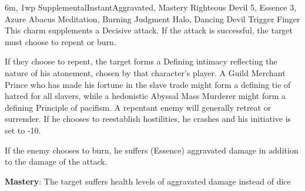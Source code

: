 {6m, 1wp}
{Supplemental}{Instant}{Aggravated, Mastery}
{Righteous Devil 5, Essence 3, Azure Abacus Meditation, Burning Judgment Halo, Dancing Devil Trigger Finger}
This charm supplements a Decisive attack.
If the attack is successful, the target must choose to repent or burn.

If they choose to repent, the target forms a Defining intimacy reflecting the nature of his atonement,
chosen by that character's player.
A Guild Merchant Prince who has made his fortune in the slave trade might form a defining tie of hatred for all slavers,
while a hedonistic Abyssal Mass Murderer might form a defining Principle of pacifism.
A repentant enemy will generally retreat or surrender.
If he chooses to reestablish hostilities, he crashes and his initiative is set to -10.

If the enemy chooses to burn, he suffers (Essence) aggravated damage in addition to the damage of the attack.

\textbf{Mastery}: The target suffers health levels of aggravated damage instead of dice

